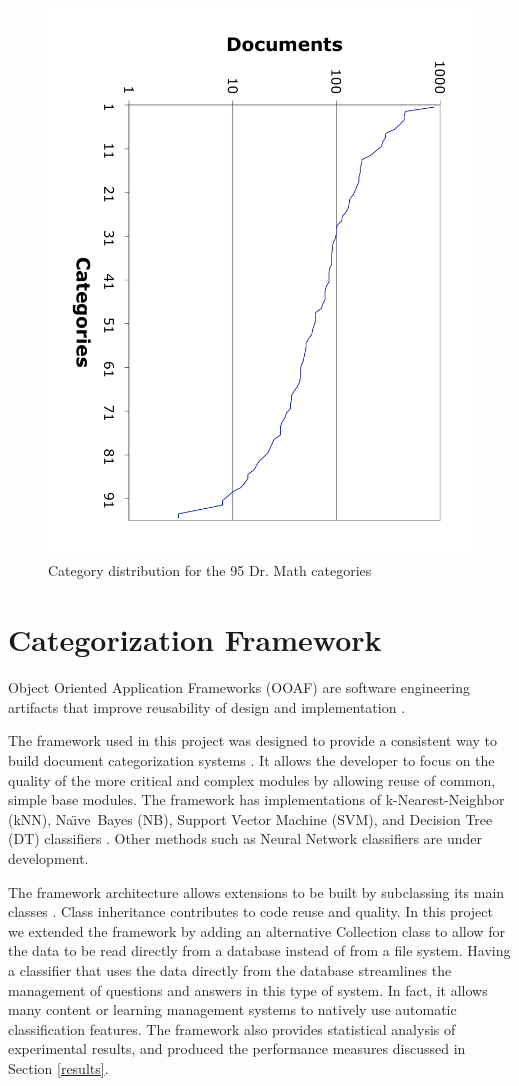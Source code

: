 \documentclass{ios}
\newcommand{\naive}{Na\"\i ve}
\begin{document}
\begin{figure}
\begin{center}
\includegraphics[angle=90,width=0.7\linewidth]{cat-distribution}
\end{center}
\caption{Category distribution for the 95 Dr. Math categories}
\label{cat-distribution}
\end{figure}


\section{Categorization Framework}

Object Oriented Application Frameworks (OOAF) are software engineering artifacts 
that improve reusability of design and implementation \cite{fayad:97, fayad:99}.

The framework used in this project was designed to provide a
consistent way to build document categorization
systems \cite{williams:02}. It allows the developer to focus on the
quality of the more critical and complex modules by allowing reuse of
common, simple base modules.  The framework has
implementations of 
k-Nearest-Neighbor (kNN), \naive\ Bayes (NB), Support Vector Machine (SVM), and
Decision Tree (DT) classifiers \cite{yang:99, sebastiani:02}. Other methods
such as Neural Network \cite{calvo:00, calvo:01} classifiers are under development.

The framework architecture allows extensions to be built by subclassing
its main classes \cite{williams:02}. Class inheritance contributes to code reuse and 
quality.
In this project we extended the framework by adding an alternative
Collection class to allow for the data to be read directly from a database instead of from a file system.  
Having a classifier that uses the data directly from the database
streamlines the management of questions and answers in this type of
system. In fact, it allows many content or learning management systems
to natively use automatic classification features.
The framework also provides statistical analysis of experimental results, and 
produced the performance measures discussed in Section \ref{results}.
\end{document}
